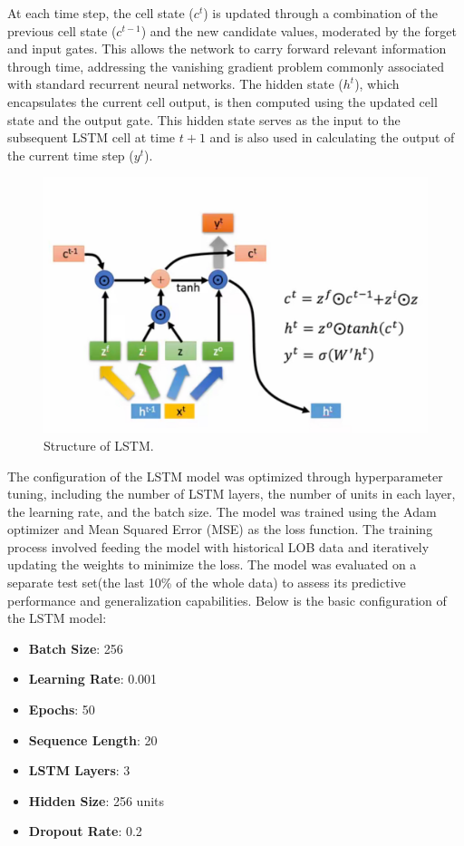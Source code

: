 \documentclass[conference]{IEEEtran}
\begin{document}
At each time step, the cell state (\( c^t \)) is updated through a combination of the previous cell state (\( c^{t-1} \)) and the new candidate values, moderated by the forget and input gates. This allows the network to carry forward relevant information through time, addressing the vanishing gradient problem commonly associated with standard recurrent neural networks. The hidden state (\( h^t \)), which encapsulates the current cell output, is then computed using the updated cell state and the output gate. This hidden state serves as the input to the subsequent LSTM cell at time \( t+1 \) and is also used in calculating the output of the current time step (\( y^t \)).


\begin{figure}[!ht]
\begin{center}
\includegraphics[width=\linewidth]{./img/lstm_structure.png} 
\caption{Structure of LSTM.}
\label{fig.1}
\end{center}
\end{figure}

The configuration of the LSTM model was optimized through hyperparameter tuning, including the number of LSTM layers, the number of units in each layer, the learning rate, and the batch size. The model was trained using the Adam optimizer and Mean Squared Error (MSE) as the loss function. The training process involved feeding the model with historical LOB data and iteratively updating the weights to minimize the loss.
The model was evaluated on a separate test set(the last 10\% of the whole data) to assess its predictive performance and generalization capabilities.
Below is the basic configuration of the LSTM model:
\begin{itemize}
    \item \textbf{Batch Size}: 256
    \item \textbf{Learning Rate}: 0.001
    \item \textbf{Epochs}: 50
    \item \textbf{Sequence Length}: 20
    \item \textbf{LSTM Layers}: 3
    \item \textbf{Hidden Size}: 256 units
    \item \textbf{Dropout Rate}: 0.2
\end{itemize}
\end{document}
